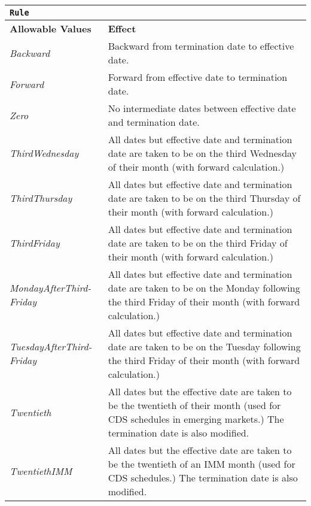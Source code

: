 \begin{longtable}{| p{} | p{} |}
\hline
\multicolumn{2}{|l|}{\lstinline!Rule!}                    \\ \hline
\textbf{Allowable Values}                   & \textbf{Effect}                       \\ \hline
\emph{Backward}   &   Backward from termination date to effective date.   \\ \hline
\emph{Forward}   &   Forward from effective date to termination date.  \\ \hline
\emph{Zero}   &   No intermediate dates between effective date and termination date.  \\ \hline
\emph{ThirdWednesday}   &   All dates but effective date and
                          termination date are taken to be on the
                          third Wednesday of their month (with forward calculation.) \\ \hline
\emph{ThirdThursday}   &   All dates but effective date and
                          termination date are taken to be on the
                          third Thursday of their month (with forward calculation.) \\ \hline
\emph{ThirdFriday}   &   All dates but effective date and
                          termination date are taken to be on the
                          third Friday of their month (with forward calculation.) \\ \hline
\emph{MondayAfterThird-} 
\emph{Friday}  &   All dates but effective date and
                          termination date are taken to be on the
                          Monday following the third Friday of their month (with forward calculation.) \\ \hline
\emph{TuesdayAfterThird-}
\emph{Friday}   &   All dates but effective date and
                          termination date are taken to be on the
                          Tuesday following the third Friday of their month (with forward calculation.) \\ \hline
\emph{Twentieth}   &   All dates but the effective date are taken to be the twentieth of their month (used for CDS schedules in emerging markets.)  The termination date is also modified. \\ \hline
\emph{TwentiethIMM}   &   All dates but the effective date are  taken to be the twentieth of an IMM month (used for CDS schedules.)  The termination date is also modified. \\ \hline

\end{longtable}
